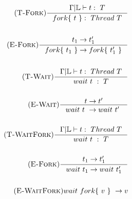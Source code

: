 \documentclass[12pt]{article}
\def\lock {\mathbb{L}}
\begin{document}
\begin{align*}
    \tag {\textsc{T-Fork}}
    \inference[]{\Gamma |\lock\vdash t:~T}{ fork \{~t~\} :~Thread~T} 
    \\
    \\
    \tag {\textsc{E-Fork}}
    \inference[]{t_1->t_1'}{fork \{~t_1~\} -> fork \{~t_1'~\}}
    \\
    \\
    \tag {\textsc{T-Wait}}
    \inference[]{\Gamma|\lock\vdash t:~Thread~T}{ wait ~t~ :~T}
    \\
    \\
    \tag {\textsc{E-Wait}}
    \inference[]{t->t'}{wait ~t~ -> wait ~t'~}
    \\
    \\
    \tag {\textsc{T-WaitFork}}
    \inference[]{\Gamma|\lock\vdash t:~Thread~T}{ wait ~t~ :~T}
    \\
    \\
    \tag {\textsc{E-Fork}}
    \inference[]{t_1->t_1'}{wait~t_1 -> wait~t_1'}
    \\
    \\
    \tag {\textsc{E-WaitFork}}
    wait ~fork \{~v~\}~ -> v
    \\
\end{align*}
\end{document}
